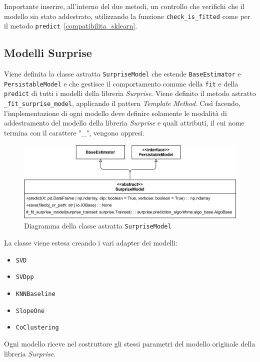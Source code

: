 Importante inserire, all'interno del due metodi, un controllo che verifichi che il modello sia stato addestrato, utilizzando la funzione \texttt{check\_is\_fitted} come per il metodo \texttt{predict}~\ref{compatibilita_sklearn}.

\subsection{Modelli Surprise}

Viene definita la classe astratta \texttt{SurpriseModel} che estende \texttt{BaseEstimator} e \texttt{PersistableModel} e che gestisce il comportamento comune della \texttt{fit} e della \texttt{predict} di tutti i modelli della libreria \textit{Surprise}. Viene definito il metodo astratto \texttt{\_fit\_surprise\_model}, applicando il pattern \textit{Template Method}. Così facendo, l'implementazione di ogni modello deve definire solamente le modalità di addestramento del modello della libreria \textit{Surprise} e quali attributi, il cui nome termina con il carattere "\_", vengono appresi.

\begin{figure}[H]
    \centering
    \includegraphics[scale=0.17]{figures/UML/models/surprise_model.png}
    \caption{Diagramma della classe astratta \texttt{SurpriseModel}}
\end{figure}


La classe viene estesa creando i vari adapter dei modelli:

\begin{itemize}
    \item \texttt{SVD}
    \item \texttt{SVDpp}
    \item \texttt{KNNBaseline}
    \item \texttt{SlopeOne}
    \item \texttt{CoClustering}
\end{itemize}

Ogni modello riceve nel costruttore gli stessi parametri del modello originale della libreria \textit{Surprise}.

